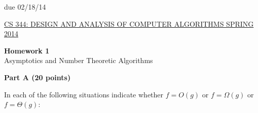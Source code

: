 \documentclass{article}
\begin{document}
\sloppy


\vspace{0.1in}

\begin{center}
due 02/18/14
\end{center}

\vspace{0.1in}

\noindent \underline{CS 344: DESIGN AND ANALYSIS OF COMPUTER
  ALGORITHMS \hspace{1.6in} SPRING 2014}

\vspace{0.1in}

\begin{center}
{\bf {\large Homework 1}}\\
Asymptotics and Number Theoretic Algorithms\\
\end{center}

\vspace{0.1in}

{\bf }

\begin{center}
{\bf Part A (20 points)}
\end{center}

 In each of the following situations
indicate whether $f=O(g)$ or $f=\Omega(g)$ or $f=\Theta(g)$:
\end{document}
